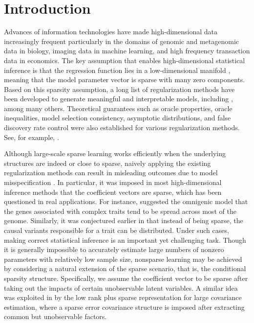 \documentclass{statsoc}
\begin{document}
\section{Introduction} \label{Sec1}
Advances of information technologies have made high-dimensional data increasingly frequent particularly in the domains of genomic and metagenomic data in biology, imaging data in machine learning, and high frequency transaction data in economics. The key assumption that enables high-dimensional statistical inference is that the regression function lies in a low-dimensional manifold \citep{Hastie2009, FanLv2010, Buhlmann2011}, meaning that the model parameter vector is sparse with many zero components. Based on this sparsity assumption, a long list of regularization methods have been developed to generate meaningful and interpretable models, including \cite{Tibshirani1996, Fan2001, Zou2005, Candes2007, Sun2012, Chen2016}, among many others. Theoretical guarantees such as oracle properties, oracle inequalities, model selection consistency, asymptotic distributions, and false discovery rate control were also established for various regularization methods. See, for example, \cite{Zhao2006, Bickel2009, Tang2010, Fan12, Fan2012, Java14, Geer14, Zhang2014, Barber15, Candes16, Lee16}.

Although large-scale sparse learning works efficiently when the underlying structures are indeed or close to sparse, naively applying the existing regularization methods can result in misleading outcomes due to model misspecification \citep{White1982, Lv2014}. In particular, it was imposed in most high-dimensional inference methods that the coefficient vectors are sparse, which has been questioned in real applications. For instance, \cite{Boyle2017} suggested the omnigenic model that the genes associated with complex traits tend to be spread across most of the genome. Similarly, it was conjectured earlier in \cite{Pritchard2001} that instead of being sparse, the causal variants responsible for a trait can be distributed. Under such cases, making correct statistical inference is an important yet challenging task. Though it is generally impossible to accurately estimate large numbers of nonzero parameters with relatively low sample size, nonsparse learning may be achieved by considering a natural extension of the sparse scenario, that is, the conditional sparsity structure. Specifically, we assume the coefficient vector to be sparse after taking out the impacts of certain unobservable latent variables. A similar idea was exploited in \cite{Fan2013} by the low rank plus sparse representation for large covariance estimation, where a sparse error covariance structure is imposed after extracting common but unobservable factors.
\end{document}
